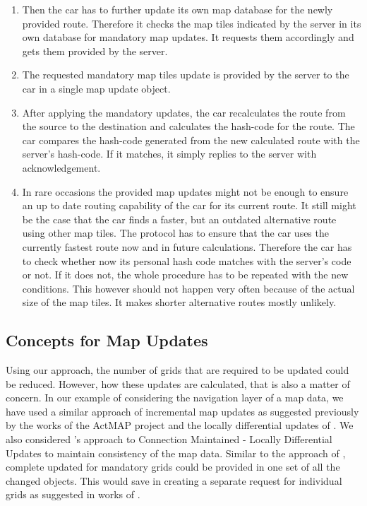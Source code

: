 \begin{enumerate}
\item Then the car has to further update its own map database for the newly provided route. Therefore it checks the map tiles indicated by the server in its own database for mandatory map updates. It requests them accordingly and gets them provided by the server.

\item The requested mandatory map tiles update is provided by the server to the car in a single map update object.

\item After applying the mandatory updates, the car recalculates the route from the source to the destination and calculates the hash-code for the route. The car compares the hash-code generated from the new calculated route with the server's hash-code. If it matches, it simply replies to the server with acknowledgement. 

\item In rare occasions the provided map updates might not be enough to ensure an up to date routing capability of the car for its current route. It still might be the case that the car finds a faster, but an outdated alternative route using other map tiles. The protocol has to ensure that the car uses the currently fastest route now and in future calculations. Therefore the car has to check whether now its personal hash code matches with the server's code or not. If it does not, the whole procedure has to be repeated with the new conditions. This however should not happen very often because of the actual size of the map tiles. It makes shorter alternative routes mostly unlikely.



\end{enumerate}


\subsection{Concepts for Map Updates} \label{calcmu}
Using our approach, the number of grids that are required to be updated could be reduced. However, how these updates are calculated, that is also a matter of concern. In our example of considering the navigation layer of a map data, we have used a similar approach of incremental map updates as suggested previously by the works of the ActMAP project \cite{flament2003actmap} and the locally differential updates of \citet{sakamoto2000proposal}. We also considered \citet{asahara2008locally}'s approach to Connection Maintained - Locally Differential Updates to maintain consistency of the map data. Similar to the approach of \citet{hitachi}, complete updated for mandatory grids could be provided in one set of all the changed objects. This would save in creating a separate request for individual grids as suggested in works of \citet{min2011system}.
